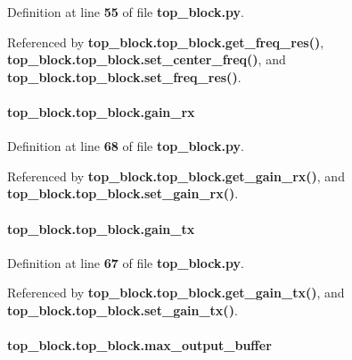 Definition at line {\bf 55} of file {\bf top\+\_\+block.\+py}.



Referenced by {\bf top\+\_\+block.\+top\+\_\+block.\+get\+\_\+freq\+\_\+res()}, {\bf top\+\_\+block.\+top\+\_\+block.\+set\+\_\+center\+\_\+freq()}, and {\bf top\+\_\+block.\+top\+\_\+block.\+set\+\_\+freq\+\_\+res()}.

\paragraph[{gain\+\_\+rx}]{\setlength{\rightskip}{0pt plus 5cm}top\+\_\+block.\+top\+\_\+block.\+gain\+\_\+rx}\label{classtop__block_1_1top__block_ab36d5a88867b0630e2bf3016850b11fc}


Definition at line {\bf 68} of file {\bf top\+\_\+block.\+py}.



Referenced by {\bf top\+\_\+block.\+top\+\_\+block.\+get\+\_\+gain\+\_\+rx()}, and {\bf top\+\_\+block.\+top\+\_\+block.\+set\+\_\+gain\+\_\+rx()}.

\paragraph[{gain\+\_\+tx}]{\setlength{\rightskip}{0pt plus 5cm}top\+\_\+block.\+top\+\_\+block.\+gain\+\_\+tx}\label{classtop__block_1_1top__block_a976869213253948ffb494c1f2c1c14ae}


Definition at line {\bf 67} of file {\bf top\+\_\+block.\+py}.



Referenced by {\bf top\+\_\+block.\+top\+\_\+block.\+get\+\_\+gain\+\_\+tx()}, and {\bf top\+\_\+block.\+top\+\_\+block.\+set\+\_\+gain\+\_\+tx()}.

\paragraph[{max\+\_\+output\+\_\+buffer}]{\setlength{\rightskip}{0pt plus 5cm}top\+\_\+block.\+top\+\_\+block.\+max\+\_\+output\+\_\+buffer}\label{classtop__block_1_1top__block_a03db8e1773c7c4920c245f9ef9803d06}


